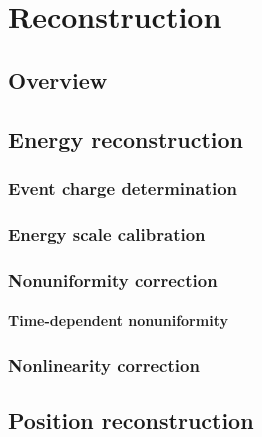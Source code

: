 \documentclass[../thesis.tex]{subfiles}
\begin{document}
\chapter{Reconstruction}
\label{chap:recon}

\section{Overview}

\section{Energy reconstruction}

\subsection{Event charge determination}

\subsection{Energy scale calibration}

\subsection{Nonuniformity correction}

\subsubsection{Time-dependent nonuniformity}

\subsection{Nonlinearity correction}

\section{Position reconstruction}
\end{document}
